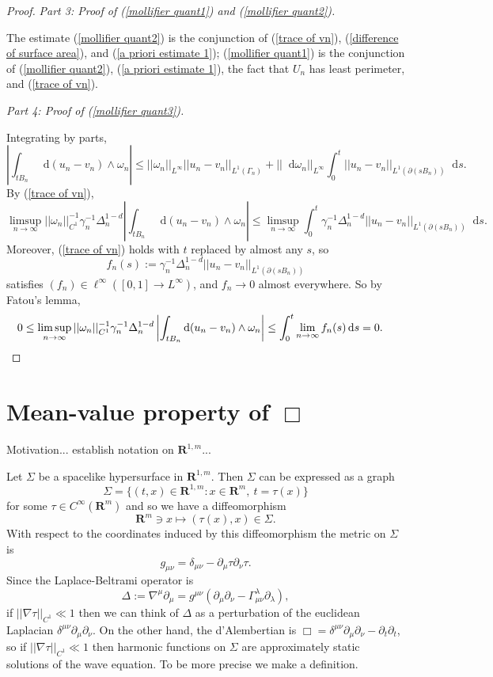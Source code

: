 \documentclass[reqno,12pt,letterpaper]{amsart}
\newcommand{\RR}{\mathbf{R}}
\newcommand*\dif{\mathop{}\!\mathrm{d}}
\theoremstyle{definition}
\newcommand{\proofpart}[2]{%
  \par
  \addvspace{\medskipamount}%
  \noindent\emph{Part #1: #2.}
}
\numberwithin{equation}{section}
\begin{document}
\begin{proof}
\proofpart{3}{Proof of (\ref{mollifier quant1}) and (\ref{mollifier quant2})}
The estimate (\ref{mollifier quant2}) is the conjunction of (\ref{trace of vn}), (\ref{difference of surface area}), and (\ref{a priori estimate 1});
(\ref{mollifier quant1}) is the conjunction of (\ref{mollifier quant2}), (\ref{a priori estimate 1}), the fact that $U_n$ has least perimeter, and (\ref{trace of vn}).

\proofpart{4}{Proof of (\ref{mollifier quant3})}
Integrating by parts,
$$\left|\int_{tB_n} \dif (u_n - v_n) \wedge \omega_n\right| \leq ||\omega_n||_{L^\infty} ||u_n - v_n||_{L^1(\Gamma_n)} + ||\dif \omega_n||_{L^\infty} \int_0^t ||u_n - v_n||_{L^1(\partial(sB_n))} \dif s.$$
By (\ref{trace of vn}),
$$\limsup_{n \to \infty} ||\omega_n||_{C^1}^{-1} \gamma_n^{-1} \Delta_n^{1 - d} \left|\int_{tB_n} \dif(u_n - v_n) \wedge \omega_n\right| \leq \limsup_{n \to \infty} \int_0^t \gamma_n^{-1} \Delta_n^{1 - d} ||u_n - v_n||_{L^1(\partial(sB_n))} \dif s.$$
Moreover, (\ref{trace of vn}) holds with $t$ replaced by almost any $s$, so
$$f_n(s) := \gamma_n^{-1} \Delta_n^{1 - d} ||u_n - v_n||_{L^1(\partial(sB_n))}$$
satisfies $(f_n) \in \ell^\infty([0, 1] \to L^\infty)$, and $f_n \to 0$ almost everywhere.
So by Fatou's lemma,
\begin{align*}
0 \leq \limsup_{n \to \infty} ||\omega_n||_{C^1}^{-1} \gamma_n^{-1} \Delta_n^{1 - d} \left|\int_{tB_n} \dif(u_n - v_n) \wedge \omega_n\right| &\leq \int_0^t \lim_{n \to \infty} f_n(s) \dif s = 0. \qedhere
\end{align*}
\end{proof}

\section{Mean-value property of \texorpdfstring{$\Box$}{the wave equation}}\label{wave section}
Motivation... establish notation on $\RR^{1, m}$...

Let $\Sigma$ be a spacelike hypersurface in $\RR^{1, m}$. Then $\Sigma$ can be expressed as a graph
$$\Sigma = \{(t, x) \in \RR^{1, m}: x \in \RR^m, ~t = \tau(x)\}$$
for some $\tau \in C^\infty(\RR^m)$ and so we have a diffeomorphism
$$\RR^m \ni x \mapsto (\tau(x), x) \in \Sigma.$$
With respect to the coordinates induced by this diffeomorphism the metric on $\Sigma$ is
$$g_{\mu\nu} = \delta_{\mu\nu} - \partial_\mu \tau \partial_\nu \tau.$$
Since the Laplace-Beltrami operator is
$$\Delta := \nabla^\mu \partial_\mu = g^{\mu \nu} (\partial_\mu \partial_\nu - \Gamma_{\mu \nu}^\lambda \partial_\lambda),$$
if $||\nabla \tau||_{C^1} \ll 1$ then we can think of $\Delta$ as a perturbation of the euclidean Laplacian $\delta^{\mu\nu} \partial_\mu \partial_\nu$.
On the other hand, the d'Alembertian is $\Box = \delta^{\mu\nu} \partial_\mu \partial_\nu - \partial_t \partial_t$, so if $||\nabla \tau||_{C^1} \ll 1$ then harmonic functions on $\Sigma$ are approximately static solutions of the wave equation.
To be more precise we make a definition.
\end{document}
